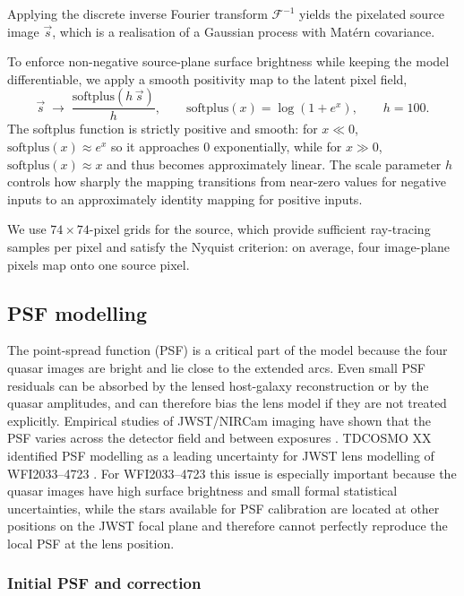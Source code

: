 \documentclass[fleqn,usenatbib]{mnras}
\begin{document}
Applying the discrete inverse Fourier transform \(\mathcal{F}^{-1}\) yields the pixelated source image \(\vec{s}\), which is a realisation of a Gaussian process with Matérn covariance.

To enforce non-negative source-plane surface brightness while keeping the model differentiable, we apply a smooth positivity map to the latent pixel field,
\begin{equation}
\vec{s}\;\longrightarrow\;\frac{\mathrm{softplus}(h\,\vec{s})}{h},\qquad 
\mathrm{softplus}(x)=\log\!\left(1+e^{x}\right),\qquad h = 100.
\end{equation}
The softplus function is strictly positive and smooth: for \(x\ll 0\), \(\mathrm{softplus}(x)\approx e^{x}\) so it approaches \(0\) exponentially, while for \(x\gg 0\), \(\mathrm{softplus}(x)\approx x\) and thus becomes approximately linear. The scale parameter \(h\) controls how sharply the mapping transitions from near-zero values for negative inputs to an approximately identity mapping for positive inputs.

We use $74\times74$-pixel grids for the source, which provide sufficient ray-tracing samples per pixel and satisfy the Nyquist criterion: on average, four image-plane pixels map onto one source pixel. 


\subsection{PSF modelling}

The point-spread function (PSF) is a critical part of the model because the four quasar images are bright and lie close to the extended arcs. Even small PSF residuals can be absorbed by the lensed host-galaxy reconstruction or by the quasar amplitudes, and can therefore bias the lens model if they are not treated explicitly. Empirical studies of JWST/NIRCam imaging have shown that the PSF varies across the detector field and between exposures \citep{Nardiello2022JWSTPSF,Zhuang2024JWSTPSF}. TDCOSMO XX identified PSF modelling as a leading uncertainty for JWST lens modelling of WFI2033--4723 \citep{Williams2025TDCOSMOXX}. For WFI2033--4723 this issue is especially important because the quasar images have high surface brightness and small formal statistical uncertainties, while the stars available for PSF calibration are located at other positions on the JWST focal plane and therefore cannot perfectly reproduce the local PSF at the lens position.

\subsubsection{Initial PSF and correction}
\end{document}
